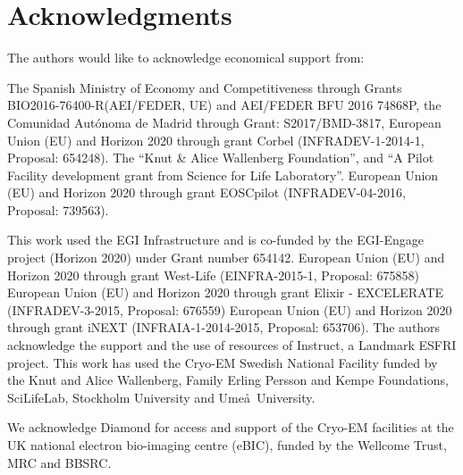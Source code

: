 \section{Acknowledgments}

The authors would like to acknowledge economical support from:

The Spanish Ministry of Economy and Competitiveness through Grants BIO2016-76400-R(AEI/FEDER, UE) and AEI/FEDER BFU 2016 74868P, the Comunidad Aut\'{o}noma de Madrid through Grant: S2017/BMD-3817, European Union (EU) and Horizon 2020 through grant Corbel (INFRADEV-1-2014-1, Proposal: 654248). The ``Knut \& Alice Wallenberg Foundation'', and ``A Pilot Facility development grant from Science for Life Laboratory''. European Union (EU) and Horizon 2020 through grant EOSCpilot (INFRADEV-04-2016, Proposal: 739563).

This work used the EGI Infrastructure and is co-funded by the EGI-Engage project (Horizon 2020) under Grant number 654142. European Union (EU) and Horizon 2020 through grant West-Life (EINFRA-2015-1, Proposal: 675858) European Union (EU) and Horizon 2020 through grant Elixir - EXCELERATE (INFRADEV-3-2015, Proposal: 676559) European Union (EU) and Horizon 2020 through grant iNEXT (INFRAIA-1-2014-2015, Proposal: 653706). The authors acknowledge the support and the use of resources of Instruct, a Landmark ESFRI project. This work has used the Cryo-EM Swedish National Facility funded by the Knut and Alice Wallenberg, Family Erling Persson and Kempe Foundations, SciLifeLab, Stockholm University and Ume\aa\ University.

We acknowledge Diamond for access and support of the Cryo-EM facilities at the UK national electron bio-imaging centre (eBIC), funded by the Wellcome Trust, MRC and BBSRC.





